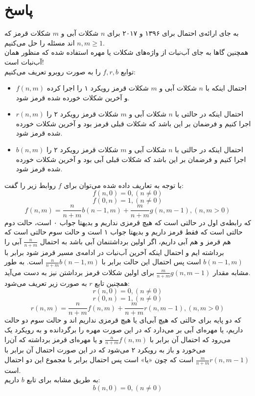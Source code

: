 \documentclass[12pt,a4paper]{article}
\begin{document}
\section*{پاسخ}
به جای ارائه‌ی احتمال برای ۱۳۹۶ و ۲۰۱۷ برای $n$ شکلات آبی و $m$ شکلات قرمز که $n, m \geq 1$ اند مسئله را حل می‌کنیم.
\\
همچنین گاها به جای آب‌نبات از واژه‌های شکلات یا مهره استفاده شده که منظور همان آب‌نبات است!
\\
توابع $f, r, b$ را به صورت روبرو تعریف می‌کنیم:
\begin{itemize}
	\item $f(n, m)$ احتمال اینکه با $n$ شکلات آبی و $m$ شکلات قرمز رویکرد ۱ را اجرا کرده و آخرین شکلات خورده شده قرمز شود.
	\item $r(n, m)$
	احتمال اینکه در حالتی با $n$ شکلات آبی و $m$ شکلات قرمز رویکرد ۲ را اجرا کنیم و فرضمان بر این باشد که شکلات قبلی قرمز بود و آخرین شکلات خورده شده قرمز شود.
	\item $b(n, m)$
	احتمال اینکه در حالتی با $n$ شکلات آبی و $m$ شکلات قرمز رویکرد ۲ را اجرا کنیم و فرضمان بر این باشد که شکلات قبلی آبی بود و آخرین شکلات خورده شده قرمز شود.
\end{itemize}
با توجه به تعاریف داده شده می‌توان برای $f$ روابط زیر را گفت:
$$ f(n, 0) = 0, (n \neq 0)$$
$$ f(0, n) = 1, (n \neq 0)$$
$$ f(n, m) = \frac{n}{n+m} b(n-1, m) + \frac{m}{n+m} g(n, m-1), (n,m > 0)$$
که رابطه‌ی اول در حالتی است که هیچ قرمزی نداریم و بدیهتا جواب ۰ است، حالت دوم حالتی است که فقط قرمز داریم و بدیهتا جواب ۱ است و حالت سوم حالتی است که هم قرمز و هم آبی داریم، اگر اولین برداشتنمان آبی باشد به احتمال $\frac{n}{n+m}$ آبی را برداشته ایم و احتمال اینکه آخرین آب‌نبات در ادامه‌ی مسیر قرمز شود برابر با $b(n-1, m)$ است پس احتمال این حالت برابر با 
$\frac{n}{n+m} b(n-1, m)$
است. به طور مشابه مقدار 
$\frac{m}{n+m} g(n, m-1)$
برای اولین شکلات قرمز برداشتن نیز به دست می‌آید.
\\
همچنین تابع $r$ به صورت زیر تعریف می‌شود:
$$r(n, 0) = 0, (n \neq 0)$$
$$r(0, n) = 1, (n \neq 0)$$
$$r(n, m) = \frac{n}{n+m} f(n, m) + \frac{m}{n+m} r(n, m-1), (n,m > 0)$$
که دو پایه برای حالتی که هیچ آبی‌ای یا هیچ قرمزی نداریم اند و حالت سوم دو حالت داریم، یا مهره‌ای آبی بر می‌دارد که در این صورت مهره را برگردانده و به رویکرد یک می‌رود که احتمال آن برابر با $\frac{n}{n+m} f(n, m)$ و یا مهره‌ای قرمز برداشته که آن‌را می‌خورد و باز به رویکرد ۲ می‌شود که در این صورت احتمال آن برابر با 
$\frac{m}{n+m} r(n, m-1)$
است که چون «یا» است پس احتمال برابر با مجموع این دو احتمال است.
\\
به طریق مشابه برای تابع $b$ داریم:
$$b(n, 0) = 0, (n \neq 0)$$
\end{document}
